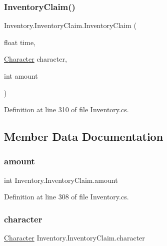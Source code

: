 \subsubsection{\texorpdfstring{Inventory\+Claim()}{InventoryClaim()}}
{\footnotesize\ttfamily Inventory.\+Inventory\+Claim.\+Inventory\+Claim (\begin{DoxyParamCaption}\item[{float}]{time,  }\item[{\hyperlink{class_project_porcupine_1_1_entities_1_1_character}{Character}}]{character,  }\item[{int}]{amount }\end{DoxyParamCaption})}



Definition at line 310 of file Inventory.\+cs.



\subsection{Member Data Documentation}
\mbox{\label{struct_inventory_1_1_inventory_claim_a4b414f97f551d59b3c761da88225c845}} 
\subsubsection{\texorpdfstring{amount}{amount}}
{\footnotesize\ttfamily int Inventory.\+Inventory\+Claim.\+amount}



Definition at line 308 of file Inventory.\+cs.

\mbox{\label{struct_inventory_1_1_inventory_claim_a3851017ecf448aef29e7f9ecd0fbb3f1}} 
\subsubsection{\texorpdfstring{character}{character}}
{\footnotesize\ttfamily \hyperlink{class_project_porcupine_1_1_entities_1_1_character}{Character} Inventory.\+Inventory\+Claim.\+character}



